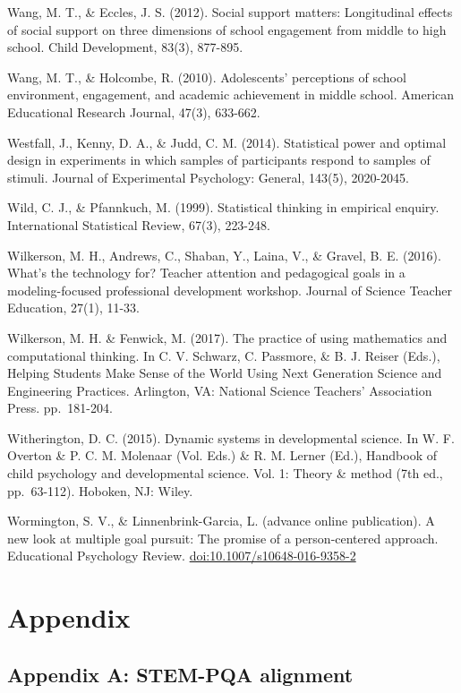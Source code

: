 \documentclass[]{book}
\theoremstyle{definition}
\theoremstyle{definition}
\theoremstyle{definition}
\theoremstyle{remark}
\begin{document}
Wang, M. T., \& Eccles, J. S. (2012). Social support matters:
Longitudinal effects of social support on three dimensions of school
engagement from middle to high school. Child Development, 83(3),
877-895.

Wang, M. T., \& Holcombe, R. (2010). Adolescents' perceptions of school
environment, engagement, and academic achievement in middle school.
American Educational Research Journal, 47(3), 633-662.

Westfall, J., Kenny, D. A., \& Judd, C. M. (2014). Statistical power and
optimal design in experiments in which samples of participants respond
to samples of stimuli. Journal of Experimental Psychology: General,
143(5), 2020-2045.

Wild, C. J., \& Pfannkuch, M. (1999). Statistical thinking in empirical
enquiry. International Statistical Review, 67(3), 223-248.

Wilkerson, M. H., Andrews, C., Shaban, Y., Laina, V., \& Gravel, B. E.
(2016). What's the technology for? Teacher attention and pedagogical
goals in a modeling-focused professional development workshop. Journal
of Science Teacher Education, 27(1), 11-33.

Wilkerson, M. H. \& Fenwick, M. (2017). The practice of using
mathematics and computational thinking. In C. V. Schwarz, C. Passmore,
\& B. J. Reiser (Eds.), Helping Students Make Sense of the World Using
Next Generation Science and Engineering Practices. Arlington, VA:
National Science Teachers' Association Press. pp.~181-204.

Witherington, D. C. (2015). Dynamic systems in developmental science. In
W. F. Overton \& P. C. M. Molenaar (Vol. Eds.) \& R. M. Lerner (Ed.),
Handbook of child psychology and developmental science. Vol. 1: Theory
\& method (7th ed., pp.~63-112). Hoboken, NJ: Wiley.

Wormington, S. V., \& Linnenbrink-Garcia, L. (advance online
publication). A new look at multiple goal pursuit: The promise of a
person-centered approach. Educational Psychology Review.
\url{doi:10.1007/s10648-016-9358-2}

\chapter{Appendix}\label{appendix}

\section{Appendix A: STEM-PQA
alignment}\label{appendix-a-stem-pqa-alignment}
\end{document}
